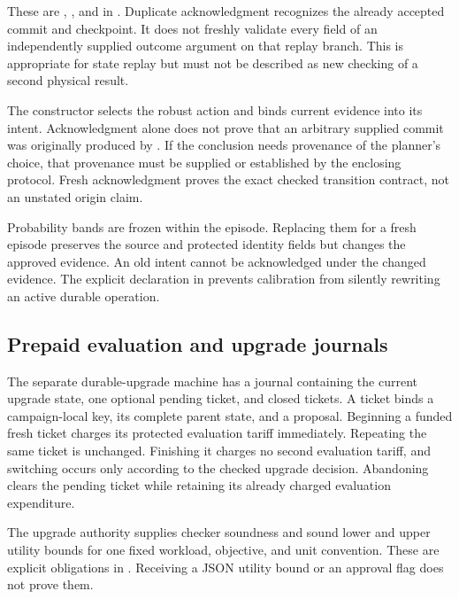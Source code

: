 These are ,
, and  in
. Duplicate acknowledgment recognizes
the already accepted commit and checkpoint. It does not freshly validate every
field of an independently supplied outcome argument on that replay branch.
This is appropriate for state replay but must not be described as new checking
of a second physical result.

The  constructor selects the robust action and binds current
evidence into its intent. Acknowledgment alone does not prove that an arbitrary
supplied commit was originally produced by . If the conclusion
needs provenance of the planner's choice, that provenance must be supplied or
established by the enclosing protocol. Fresh acknowledgment proves the exact
checked transition contract, not an unstated origin claim.

Probability bands are frozen within the episode. Replacing them for a fresh
episode preserves the source and protected identity fields but changes the
approved evidence. An old intent cannot be acknowledged under the changed
evidence. The explicit declaration
 in
 prevents calibration from silently
rewriting an active durable operation.

\subsection{Prepaid evaluation and upgrade journals}

The separate durable-upgrade machine has a journal containing the current
upgrade state, one optional pending ticket, and closed tickets. A ticket binds
a campaign-local key, its complete parent state, and a proposal. Beginning a
funded fresh ticket charges its protected evaluation tariff immediately.
Repeating the same ticket is unchanged. Finishing it charges no second
evaluation tariff, and switching occurs only according to the checked upgrade
decision. Abandoning clears the pending ticket while retaining its already
charged evaluation expenditure.

The upgrade authority supplies checker soundness and sound lower and upper
utility bounds for one fixed workload, objective, and unit convention. These
are explicit obligations in . Receiving a JSON
utility bound or an approval flag does not prove them.

